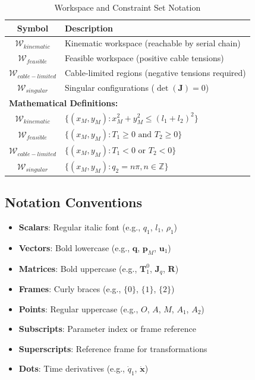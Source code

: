 \begin{table}[h!]
\centering
\caption{Workspace and Constraint Set Notation}
\begin{tabular}{|c|l|}
\hline
\textbf{Symbol} & \textbf{Description} \\
\hline
$\mathcal{W}_{kinematic}$ & Kinematic workspace (reachable by serial chain) \\
$\mathcal{W}_{feasible}$ & Feasible workspace (positive cable tensions) \\
$\mathcal{W}_{cable-limited}$ & Cable-limited regions (negative tensions required) \\
$\mathcal{W}_{singular}$ & Singular configurations ($\det(\bm{J}) = 0$) \\
\hline
\multicolumn{2}{|l|}{\textbf{Mathematical Definitions:}} \\
\hline
$\mathcal{W}_{kinematic}$ & $\{(x_M, y_M) : x_M^2 + y_M^2 \leq (l_1 + l_2)^2\}$ \\
$\mathcal{W}_{feasible}$ & $\{(x_M, y_M) : T_1 \geq 0 \text{ and } T_2 \geq 0\}$ \\
$\mathcal{W}_{cable-limited}$ & $\{(x_M, y_M) : T_1 < 0 \text{ or } T_2 < 0\}$ \\
$\mathcal{W}_{singular}$ & $\{(x_M, y_M) : q_2 = n\pi, n \in \mathbb{Z}\}$ \\
\hline
\end{tabular}
\end{table}

\subsection{Notation Conventions}

\begin{itemize}
    \item \textbf{Scalars}: Regular italic font (e.g., $q_1$, $l_1$, $\rho_1$)
    \item \textbf{Vectors}: Bold lowercase (e.g., $\bm{q}$, $\bm{p}_M$, $\bm{u}_1$)
    \item \textbf{Matrices}: Bold uppercase (e.g., $\bm{T}_1^0$, $\bm{J}_q$, $\bm{R}$)
    \item \textbf{Frames}: Curly braces (e.g., $\{0\}$, $\{1\}$, $\{2\}$)
    \item \textbf{Points}: Regular uppercase (e.g., $O$, $A$, $M$, $A_1$, $A_2$)
    \item \textbf{Subscripts}: Parameter index or frame reference
    \item \textbf{Superscripts}: Reference frame for transformations
    \item \textbf{Dots}: Time derivatives (e.g., $\dot{q}_1$, $\dot{\bm{x}}$)
\end{itemize}


